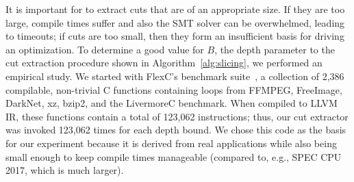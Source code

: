 It is important for \minotaur{} to extract cuts that are of an appropriate
size.
%
If they are too large, compile times suffer and also the SMT solver
can be overwhelmed, leading to timeouts; if cuts are too small, then
they form an insufficient basis for driving an optimization.
%
To determine a good value for $B$, the depth parameter to the cut
extraction procedure shown in Algorithm~\ref{alg:slicing}, we
performed an empirical study.
%
We started with FlexC's benchmark suite~\cite{woodruff2023rewriting},
a collection of 2,386 compilable, non-trivial C functions containing
loops from FFMPEG, FreeImage, DarkNet, xz, bzip2, and the LivermoreC
benchmark.
%
When compiled to LLVM IR, these functions contain a total of 123,062
instructions; thus, our cut extractor was invoked 123,062 times for
each depth bound.
%
We chose this code as the basis for our experiment because it is
derived from real applications while also being small enough to
keep compile times manageable (compared to, e.g., SPEC CPU 2017,
which is much larger).


